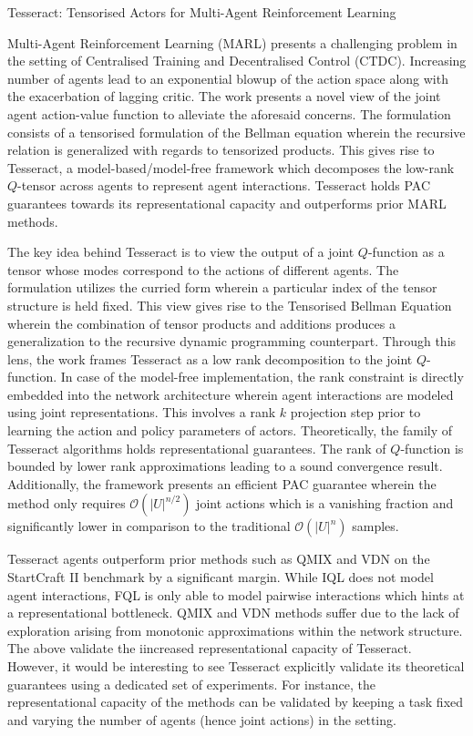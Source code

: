 \documentclass[11pt,letterpaper]{article}
\begin{document}
\begin{center}
  \large{Tesseract: Tensorised Actors for Multi-Agent Reinforcement Learning}
\end{center}

Multi-Agent Reinforcement Learning (MARL) presents a challenging problem in the setting of Centralised Training and Decentralised Control (CTDC). Increasing number of agents lead to an exponential blowup of the action space along with the exacerbation of lagging critic. The work presents a novel view of the joint agent action-value function to alleviate the aforesaid concerns. The formulation consists of a tensorised formulation of the Bellman equation wherein the recursive relation is generalized with regards to tensorized products. This gives rise to Tesseract, a model-based/model-free framework which decomposes the low-rank $Q$-tensor across agents to represent agent interactions. Tesseract holds PAC guarantees towards its representational capacity and outperforms prior MARL methods.

The key idea behind Tesseract is to view the output of a joint $Q$-function as a tensor whose modes correspond to the actions of different agents. The formulation utilizes the curried form wherein a particular index of the tensor structure is held fixed. This view gives rise to the Tensorised Bellman Equation wherein the combination of tensor products and additions produces a generalization to the recursive dynamic programming counterpart. Through this lens, the work frames Tesseract as a low rank decomposition to the joint $Q$-function. In case of the model-free implementation, the rank constraint is directly embedded into the network architecture wherein agent interactions are modeled using joint representations. This involves a rank $k$ projection step prior to learning the action and policy parameters of actors. Theoretically, the family of Tesseract algorithms holds representational guarantees. The rank of $Q$-function is bounded by lower rank approximations leading to a sound convergence result. Additionally, the framework presents an efficient PAC guarantee wherein the method only requires $\mathcal{O}(|U|^{n/2})$ joint actions which is a vanishing fraction and significantly lower in comparison to the traditional $\mathcal{O}(|U|^{n})$ samples.

Tesseract agents outperform prior methods such as QMIX and VDN on the StartCraft II benchmark by a significant margin. While IQL does not model agent interactions, FQL is only able to model pairwise interactions which hints at a representational bottleneck. QMIX and VDN methods suffer due to the lack of exploration arising from monotonic approximations within the network structure. The above validate the iincreased representational capacity of Tesseract. However, it would be interesting to see Tesseract explicitly validate its theoretical guarantees using a dedicated set of experiments. For instance, the representational capacity of the methods can be validated by keeping a task fixed and varying the number of agents (hence joint actions) in the setting.
\end{document}
